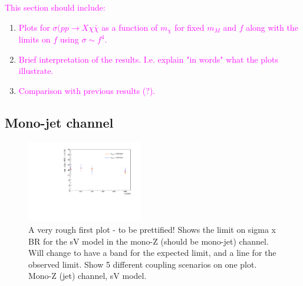 \begin{flushleft}
\textcolor{magenta}{This section should include:}
\begin{enumerate}
\item \textcolor{magenta}{Plots for $\sigma(pp \rightarrow X \chi \bar{\chi}$ as a function of $m_{\chi}$ for fixed $m_{M}$ and $f$ along with the limits on $f$ using $\sigma \sim f^{4}$.}
\item \textcolor{magenta}{Brief interpretation of the results. I.e. explain "in words" what the plots illustrate.}
\item \textcolor{magenta}{Comparison with previous results (?).}
\end{enumerate}
\end{flushleft}

\subsection{Mono-jet channel}

\begin{figure}
\begin{center}
\includegraphics[width=0.45\textwidth]{figures/monoZ_sigma_limits_variedDMmass.pdf}
\caption{A very rough first plot - to be prettified! Shows the limit on sigma x BR for the sV model in the mono-Z (should be mono-jet) channel. Will change to have a band for the expected limit, and a line for the observed limit. Show 5 different coupling scenarios on one plot. Mono-Z (jet) channel, sV model.}
\label{fig:MonoZ_SVD_limit}
\end{center}
\end{figure}


